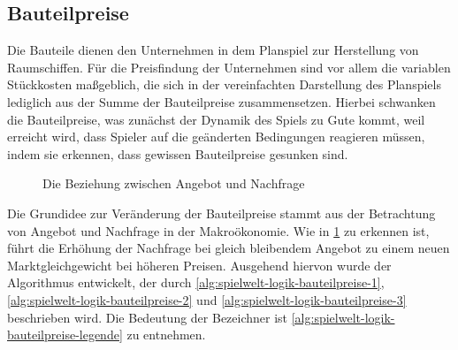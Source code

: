 \subsection{Bauteilpreise}
\label{sub:spielwelt-logik-bauteilpreise}

Die Bauteile dienen den Unternehmen in dem Planspiel zur Herstellung von Raumschiffen. Für die
Preisfindung der Unternehmen sind vor allem die variablen Stückkosten maßgeblich, die sich in der
vereinfachten Darstellung des Planspiels lediglich aus der Summe der Bauteilpreise zusammensetzen.
Hierbei schwanken die Bauteilpreise, was zunächst der Dynamik des Spiels zu Gute kommt, weil
erreicht wird, dass Spieler auf die geänderten Bedingungen reagieren müssen, indem sie erkennen,
dass gewissen Bauteilpreise gesunken sind.

\begin{figure}[ht]
     \centering
% 
% 
% 
% 
     \caption{Die Beziehung zwischen Angebot und Nachfrage}
     \label{img:spielwelt-logik-bauteilpreise-preismengendiagramm}
\end{figure}

Die Grundidee zur Veränderung der Bauteilpreise stammt aus der Betrachtung von Angebot und Nachfrage
in der Makroökonomie. Wie in
\ref{img:spielwelt-logik-bauteilpreise-preismengendiagramm}
zu erkennen ist, führt die Erhöhung der Nachfrage bei gleich bleibendem Angebot zu einem neuen
Marktgleichgewicht bei höheren Preisen. Ausgehend hiervon wurde der Algorithmus entwickelt, der
durch \ref{alg:spielwelt-logik-bauteilpreise-1}, \ref{alg:spielwelt-logik-bauteilpreise-2} und
\ref{alg:spielwelt-logik-bauteilpreise-3}
beschrieben wird. Die Bedeutung der Bezeichner ist \ref{alg:spielwelt-logik-bauteilpreise-legende}
zu entnehmen.

